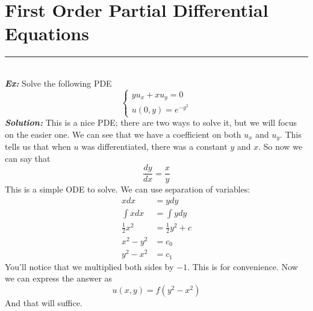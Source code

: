 \documentclass{article}
\begin{document}
\newpage
\section{First Order Partial Differential Equations}
\hrule
\noindent\\
\noindent\textbf{\textit{Ex:}} Solve the following PDE
\[
\begin{cases*}
yu_{x} + xu_{y} = 0\\
u(0,y) = e^{-y^{2}}
\end{cases*}
\]
\indent \textbf{\textit{Solution:}} This is a nice PDE; there are two ways to solve it, but we will focus on the easier one. We can see that we have a coefficient on both $u_{x}$ and $u_{y}$. This tells us that when $u$ was differentiated, there was a constant $y$ and $x$. So now we can say that
\[
\frac{dy}{dx} = \frac{x}{y}
\]
\noindent This is a simple ODE to solve. We can use separation of variables:
\begin{align*}
xdx &= ydy\\
\int{x dx} &= \int{y dy}\\
\frac{1}{2}x^{2} &= \frac{1}{2}y^{2} + c\\
x^{2} - y^{2} &= c_{0}\\
y^{2} - x^{2} &= c_{1}
\end{align*}
\noindent You'll notice that we multiplied both sides by $-1$. This is for convenience. Now we can express the answer as
\[
u(x,y) = f(y^{2} - x^{2})
\]
\noindent And that will suffice.
\end{document}
